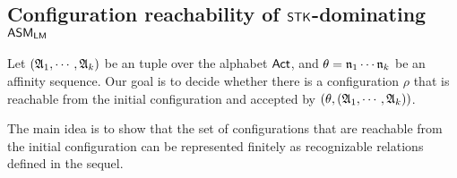 




\subsection{Configuration reachability of $\mathsf{STK}$-dominating $\textsf{ASM}_\textsf{LM}$}
  
Let $({\mathfrak{A} }_1,\cdots,{\mathfrak{A} }_k)$ be an {\NFA} tuple over the alphabet ${\sf Act}$, and $\theta = \mathfrak{n}_1\cdots\mathfrak{n}_k$ be an affinity sequence. 
Our goal is to decide whether there is a configuration $\rho$ that is reachable from the initial configuration and accepted by $(\theta, ({\mathfrak{A} }_1,\cdots,{\mathfrak{A} }_k))$.

The main idea is to show that the set of configurations that are reachable from the initial configuration can be represented finitely as recognizable relations defined in the sequel. 


